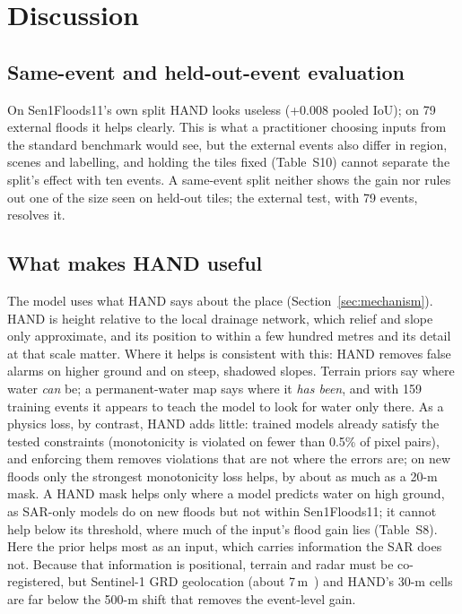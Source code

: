 \section{Discussion}
\label{sec:discussion}

\subsection{Same-event and held-out-event evaluation}
On Sen1Floods11's own split HAND looks useless (+0.008 pooled IoU); on 79 external floods it helps clearly.
This is what a practitioner choosing inputs from the standard benchmark would see, but the external events
also differ in region, scenes and labelling, and holding the tiles fixed (Table~S10) cannot separate the
split's effect with ten events. A same-event split neither shows the gain nor rules out one of the size seen
on held-out tiles; the external test, with 79 events, resolves it.

\subsection{What makes HAND useful}
The model uses what HAND says about the place (Section~\ref{sec:mechanism}). HAND is height relative to the local drainage
network, which relief and slope only approximate, and its position to within a few hundred metres and its
detail at that scale matter. Where it helps is consistent with this: HAND removes false alarms on higher
ground and on steep, shadowed slopes. Terrain priors say where water \emph{can} be; a permanent-water map says
where it \emph{has been}, and with 159 training events it appears to teach the model to look for water only there. As a physics loss, by contrast, HAND adds little:
trained models already satisfy the tested constraints (monotonicity is violated on fewer than 0.5\% of pixel
pairs), and enforcing them removes violations that are not where the errors are; on new floods only the
strongest monotonicity loss helps, by about as much as a 20-m mask. A HAND mask helps only
where a model predicts water on high ground, as SAR-only models do on new floods but not within
Sen1Floods11; it cannot help below its threshold, where much of the input's flood gain lies (Table~S8).
Here the prior helps most as an input, which carries information the SAR does not. Because that
information is positional, terrain and radar must be co-registered, but Sentinel-1 GRD geolocation (about
7\,m~\cite{s1iwgrd}) and HAND's 30-m cells are far below the 500-m shift that removes the event-level gain.

